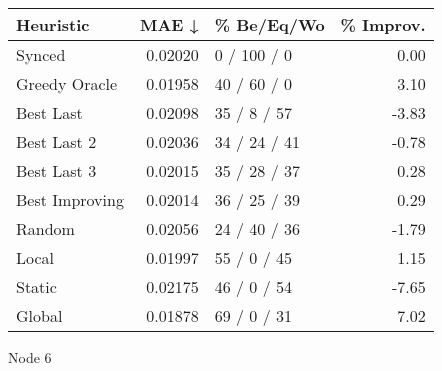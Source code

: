 \begin{tabular}{lrlr}
\toprule
\textbf{Heuristic} & \textbf{MAE ↓} & \textbf{\% Be/Eq/Wo} & \textbf{\% Improv.} \\
\midrule
            Synced &        0.02020 &          0 / 100 / 0 &                0.00 \\
     Greedy Oracle &        0.01958 &          40 / 60 / 0 &                3.10 \\
         Best Last &        0.02098 &          35 / 8 / 57 &               -3.83 \\
       Best Last 2 &        0.02036 &         34 / 24 / 41 &               -0.78 \\
       Best Last 3 &        0.02015 &         35 / 28 / 37 &                0.28 \\
    Best Improving &        0.02014 &         36 / 25 / 39 &                0.29 \\
            Random &        0.02056 &         24 / 40 / 36 &               -1.79 \\
             Local &        0.01997 &          55 / 0 / 45 &                1.15 \\
            Static &        0.02175 &          46 / 0 / 54 &               -7.65 \\
            Global &        0.01878 &          69 / 0 / 31 &                7.02 \\
\bottomrule
\end{tabular}
\caption{Node 6}
\label{tab:non_lr01_le1_bs2_6}
